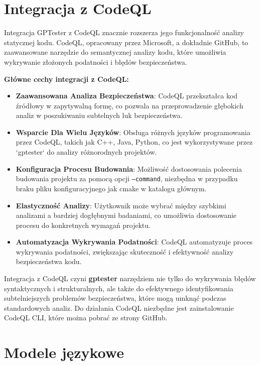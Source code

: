 \section{Integracja z CodeQL}
\label{sec:integracja_codeql}

Integracja GPTester z CodeQL znacznie rozszerza jego funkcjonalność analizy statycznej kodu. CodeQL, opracowany przez Microsoft, a dokładnie GitHub, to zaawansowane narzędzie do semantycznej analizy kodu, które umożliwia wykrywanie złożonych podatności i błędów bezpieczeństwa.

\textbf{Główne cechy integracji z CodeQL:}
\begin{itemize}
    \item \textbf{Zaawansowana Analiza Bezpieczeństwa}: CodeQL przekształca kod źródłowy w zapytywalną formę, co pozwala na przeprowadzenie głębokich analiz w poszukiwaniu subtelnych luk bezpieczeństwa.
    \item \textbf{Wsparcie Dla Wielu Języków}: Obsługa różnych języków programowania przez CodeQL, takich jak C++, Java, Python, co jest wykorzystywane przez `gptester` do analizy różnorodnych projektów.
    \item \textbf{Konfiguracja Procesu Budowania}: Możliwość dostosowania polecenia budowania projektu za pomocą opcji \texttt{--command}, niezbędna w przypadku braku pliku konfiguracyjnego jak cmake w katalogu głównym.
    \item \textbf{Elastyczność Analizy}: Użytkownik może wybrać między szybkimi analizami a bardziej dogłębnymi badaniami, co umożliwia dostosowanie procesu do konkretnych wymagań projektu.
    \item \textbf{Automatyzacja Wykrywania Podatności}: CodeQL automatyzuje proces wykrywania podatności, zwiększając skuteczność i efektywność analizy bezpieczeństwa kodu.
\end{itemize}

Integracja z CodeQL czyni \textbf{gptester} narzędziem nie tylko do wykrywania błędów syntaktycznych i strukturalnych, ale także do efektywnego identyfikowania subtelniejszych problemów bezpieczeństwa, które mogą umknąć podczas standardowych analiz.
Do działania CodeQL niezbędne jest zainstalowanie CodeQL CLI, które można pobrać ze strony GitHub.

\section{Modele językowe}
\label{sec:modele_jezykowe}

